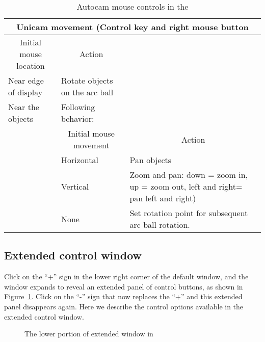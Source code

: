 \begin{table}
\begin{center}
\begin{tabular}{|l|l|p{3in}|} \hline
    \multicolumn{3}{|c|}{\large Unicam movement (Control key and right mouse
    button} \\ \hline \hline
    \multicolumn{1}{|c|}{Initial mouse location} & 
    \multicolumn{1}{|c|}{Action} & \\ 
    \hline
    Near edge of display & Rotate objects on the arc ball & \\
    Near the objects & Following behavior: & \\
    \hline
    & \multicolumn{1}{|c|}{Initial mouse movement} & 
    \multicolumn{1}{|c|}{Action}\\ \hline
    & Horizontal & Pan objects \\ 
    & Vertical & Zoom and pan: down = zoom in, up = zoom
    out, left and right= pan left and right) \\
    & None & Set rotation point for subsequent arc ball rotation.\\
    \hline
\end{tabular}
\caption{\label{tab:view-unicam} Autocam mouse controls in the \viewer{}}
\end{center}
\end{table}



\subsection{Extended control window}
\label{sec:view-control} 

Click on the ``+'' sign in the lower right corner of the default
\viewer{} window, and the window expands to reveal an extended panel of
control buttons, as shown in Figure~\ref{fig:extviewwindow}.  Click on the
``-'' sign that now replaces the ``+'' and this extended panel disappears
again.  Here we describe the control options available in the extended
control window.

\begin{figure}[htb]
  \begin{makeimage}
  \end{makeimage}
  \extendedwindow
  \caption{\label{fig:extviewwindow} The lower portion of extended
    \viewer{} window in \SR{}} 
\end{figure}


